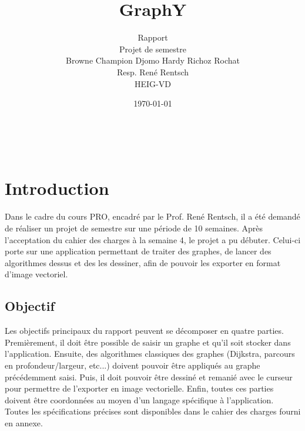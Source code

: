 \documentclass[french]{article}
\begin{document}
	
	
	\title{GraphY} %
	\author{Rapport\\ 
		Projet de semestre\\
		Browne Champion Djomo Hardy Richoz Rochat\\
		Resp. René Rentsch\\
		HEIG-VD}
	\date{\today} %
	\maketitle
	\thispagestyle{empty}
	
	\newpage
	\thispagestyle{empty}
	$ $
	\newpage
	

	
	\tableofcontents
	
	\listoffigures
	
	\justify
	\normalsize
	
	\section{Introduction}
	Dans le cadre du cours PRO, encadré par le Prof. René Rentsch, il a été demandé de réaliser un projet de semestre sur une période de 10 semaines. Après l'acceptation du cahier des charges à la semaine 4, le projet a pu débuter. Celui-ci porte sur une application permettant de traiter des graphes, de lancer des algorithmes dessus et des les dessiner, afin de pouvoir les exporter en format d'image vectoriel.
	
		\subsection{Objectif}
		Les objectifs principaux du rapport peuvent se décomposer en quatre parties. Premièrement, il doit être possible de saisir un graphe et qu'il soit stocker dans l'application. Ensuite, des algorithmes classiques des graphes (Dijkstra, parcours en profondeur/largeur, etc...) doivent pouvoir être appliqués au graphe précédemment saisi. Puis, il doit pouvoir être dessiné et remanié avec le curseur pour permettre de l'exporter en image vectorielle. Enfin, toutes ces parties doivent être coordonnées au moyen d'un langage spécifique à l'application.\\
		Toutes les spécifications précises sont disponibles dans le cahier des charges fourni en annexe.
		
\end{document}
